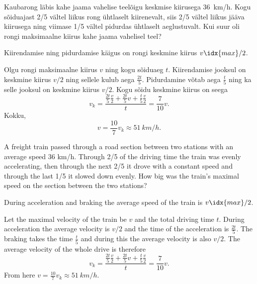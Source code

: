 
Kaubarong läbis kahe jaama vahelise teelõigu keskmise kiirusega \SI{36}{km/h}.
Kogu sõiduajast 2/5 vältel liikus rong ühtlaselt kiirenevalt, siis 2/5 vältel
liikus jääva kiirusega ning viimase 1/5 vältel pidurdas ühtlaselt aeglustuvalt.
Kui suur oli rongi maksimaalne kiirus kahe jaama vahelisel teel?

\hint
Kiirendamise ning pidurdamise käigus on rongi keskmine kiirus $v\idx{max}/2$.

\solu
Olgu rongi maksimaalne kiirus $v$ ning kogu sõiduaeg $t$. Kiirendamise jooksul on keskmine kiirus $v/2$ ning sellele kulub aega $\frac{2t}{5}$. Pidurdamine võtab aega $\frac{t}{5}$ ning ka selle jooksul on keskmine kiirus $v/2$. Kogu sõidu keskmine kiirus on seega 
$$v_k = \frac{\frac{2t}{5} \frac{v}{2}+\frac{2t}{5} v + \frac{t}{5} \frac{v}{2}}{t} = \frac{7}{10} v.$$ 
Kokku,
\[
v=\frac{10}{7}v_k \approx \SI{51}{km/h}.
\]

A freight train passed through a road section between two stations with an average speed 36 km/h. Through 2/5 of the driving time the train was evenly accelerating, then through the next 2/5 it drove with a constant speed and through the last 1/5 it slowed down evenly. How big was the train’s maximal speed on the section between the two stations?

\hinteng
During acceleration and braking the average speed of the train is $v\idx{max}/2$.

\solueng
Let the maximal velocity of the train be $v$ and the total driving time $t$. During acceleration the average velocity is $v/2$ and the time of the acceleration is $\frac{2t}{5}$. The braking takes the time $\frac{t}{5}$ and during this the average velocity is also $v/2$. The average velocity of the whole drive is therefore
$$v_k = \frac{\frac{2t}{5} \frac{v}{2}+\frac{2t}{5} v + \frac{t}{5} \frac{v}{2}}{t} = \frac{7}{10} v.$$
From here $v=\frac{10}{7}v_k \approx \SI{51}{km/h}$.
\probend